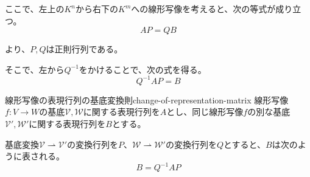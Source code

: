 \documentclass[../../../topic_linear-algebra]{subfiles}
\begin{document}
\br

ここで、左上の$K^n$から右下の$K^m$への線形写像を考えると、次の等式が成り立つ。
\begin{equation*}
  AP = QB
\end{equation*}

より、$P,Q$は正則行列である。

そこで、左から$Q^{-1}$をかけることで、次の式を得る。
\begin{equation*}
  Q^{-1}AP = B
\end{equation*}

\begin{theorem}{線形写像の表現行列の基底変換則}{change-of-representation-matrix}
  線形写像$f\colon V \to W$の基底$\mathcal{V},\mathcal{W}$に関する表現行列を$A$とし、同じ線形写像$f$の別な基底$\mathcal{V}', \mathcal{W}'$に関する表現行列を$B$とする。
  
  基底変換$\mathcal{V} \rightharpoonup \mathcal{V}'$の変換行列を$P$、$\mathcal{W} \rightharpoonup \mathcal{W}'$の変換行列を$Q$とすると、$B$は次のように表される。
  \begin{equation*}
    B = Q^{-1} A P
  \end{equation*}
\end{theorem}
\end{document}
